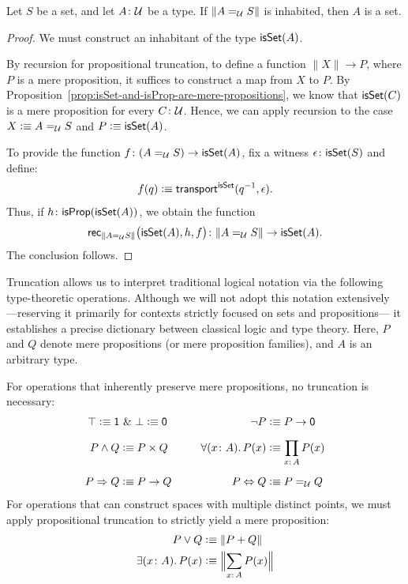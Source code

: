 \begin{lem}\fe\label{lem:trucated-eq-to-set-is-set}
    Let\/ $S$ be a set, and let\/ $A\colon\univ$ be a type. If\/ $\lVert A\mathrel{=_{\mathcal U}} S\rVert$ is inhabited, then\/ $A$ is a set.
\end{lem}

\begin{proof}
    We must construct an inhabitant of the type $\mathsf{isSet}(A)$. 
    
    By recursion for propositional truncation, to define a function $\lVert X\rVert\to P$, where $P$ is a mere proposition, it suffices to construct a map from $X$ to $P$. By Proposition~\ref{prop:isSet-and-isProp-are-mere-propositions}, we know that $\mathsf{isSet}(C)$ is a mere proposition for every $C\colon\univ$. Hence, we can apply recursion to the case $X\mathrel{\vcentcolon}\equiv A\mathrel{=_{\mathcal U}} S$ and $P\mathrel{\vcentcolon}\equiv\mathsf{isSet}(A)$.
    
    To provide the function $f\colon(A\eq\univ S)\to\fun{isSet}(A)$, fix a witness $\epsilon\colon\fun{isSet}(S)$ and define:
    \[
        f(q)\mathrel{\vcentcolon}\equiv\mathsf{transport}^{\mathsf{isSet}}(q^{-1},\epsilon).
    \]
    Thus, if $h\colon\fun{isProp}(\fun{isSet}(A))$, we obtain the function
    \[
        \fun{rec}_{\lVert A\eq\univ S\rVert}\bigl(\fun{isSet}(A),h,f\bigr)
            \colon\lVert A\eq\univ S\rVert\to\fun{isSet}(A).
    \]
    The conclusion follows.
\end{proof}

\begin{ntn}\label{ntn:logic}
    Truncation allows us to interpret traditional logical notation via the following type-theoretic operations. Although we will not adopt this notation extensively ---reserving it primarily for contexts strictly focused on sets and propositions--- it establishes a precise dictionary between classical logic and type theory. Here, $P$ and\/ $Q$ denote mere propositions (or mere proposition families), and\/ $A$ is an arbitrary type. 
    
    For operations that inherently preserve mere propositions, no truncation is necessary:
    \begin{align*}
        \top\defeq\fun1&\text{\upshape\ \& }\bot\defeq\fun0
            &\neg P&\defeq P\to\fun0\\[1.9mm]
        P\land Q&\defeq P\times Q\qquad
            &\forall(x\colon A).\,P(x)&\defeq\prod_{x\colon A}P(x)\\[1.9mm]
        P\Rightarrow Q&\defeq P\to Q
            &P\Leftrightarrow Q&\defeq P\eq\univ Q
    \end{align*}
    For operations that can construct spaces with multiple distinct points, we must apply propositional truncation to strictly yield a mere proposition:
    \begin{align*}
        P\lor Q&\defeq\lVert P+Q\rVert\\
        \exists(x\colon A).\,P(x)&\defeq\Bigl\lVert\sum_{x\colon A}P(x)\Bigr\rVert
    \end{align*}
\end{ntn}

